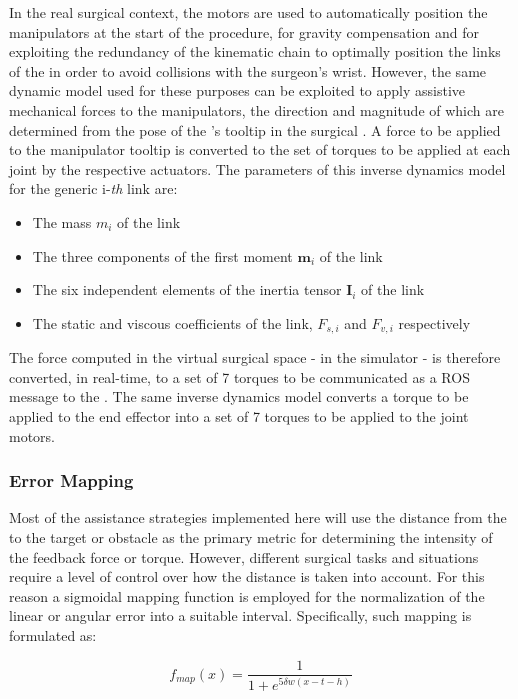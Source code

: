 \documentclass[../main.tex]{subfiles}
\begin{document}
In the real surgical context, the motors are used to automatically position the manipulators at the start of the procedure, for gravity compensation and for exploiting the redundancy of the kinematic chain to optimally position the links of the \mtm in order to avoid collisions with the surgeon's wrist. However, the same dynamic model used for these purposes can be exploited to apply assistive mechanical forces to the manipulators, the direction and magnitude of which are determined from the pose of the \psms's tooltip in the surgical \rf. A force to be applied to the manipulator tooltip is converted to the set of torques to be applied at each joint by the respective actuators. The parameters of this inverse dynamics model \cite{Fontanelli2017} for the generic i-\textit{th} link are:
\begin{itemize}
  \item The mass $m_i$ of the link
  \item The three components of the first moment $\textbf{m}_i$ of the link
  \item The six independent elements of the inertia tensor $\textbf{I}_i$ of the link
  \item The static and viscous coefficients of the link, $F_{s,i}$ and $F_{v,i}$ respectively
\end{itemize}

The \vf force computed in the virtual surgical space - in the simulator - is therefore converted, in real-time, to a set of 7 torques to be communicated as a ROS message to the \mtms. 
The same inverse dynamics model converts a torque to be applied to the end effector into a set of 7 torques to be applied to the joint motors. 

\subsubsection{Error Mapping}
Most of the assistance strategies implemented here will use the distance from the \psm to the target or obstacle as the primary metric for determining the intensity of the feedback force or torque. However, different surgical tasks and situations require a level of control over how the distance is taken into account. For this reason a sigmoidal mapping function is employed for the normalization of the linear or angular error into a suitable interval. Specifically, such mapping is formulated as:

\begin{equation}
  f_{map}(x) = \frac{1}{1+e^{5\delta w(x-t-h)}}
  \label{eq:sigmoidalmap}
\end{equation}
\end{document}
